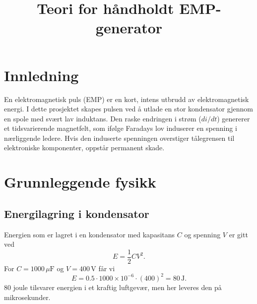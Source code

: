 \documentclass{article}
\title{Teori for håndholdt EMP-generator}
\author{}
\date{}
\begin{document}
\maketitle

\section{Innledning}
En elektromagnetisk puls (EMP) er en kort, intens utbrudd av elektromagnetisk energi. I dette prosjektet skapes pulsen ved å utlade en stor kondensator gjennom en spole med svært lav induktans. Den raske endringen i strøm ($di/dt$) genererer et tidsvarierende magnetfelt, som ifølge Faradays lov induserer en spenning i nærliggende ledere. Hvis den induserte spenningen overstiger tålegrensen til elektroniske komponenter, oppstår permanent skade.

\section{Grunnleggende fysikk}

\subsection{Energilagring i kondensator}
Energien som er lagret i en kondensator med kapasitans $C$ og spenning $V$ er gitt ved
\begin{equation}
E = \frac{1}{2} C V^2.
\end{equation}
For $C = 1000\,\mu\text{F}$ og $V = 400\,\text{V}$ får vi
\begin{equation}
E = 0.5 \cdot 1000 \times 10^{-6} \cdot (400)^2 = 80\,\text{J}.
\end{equation}
80 joule tilsvarer energien i et kraftig luftgevær, men her leveres den på mikrosekunder.
\end{document}
